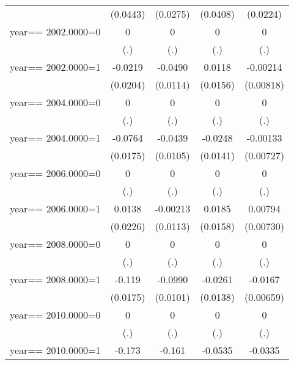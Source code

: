 \begin{table}[htbp]
\begin{tabular}{l*{4}{c}}
                & (0.0443)         & (0.0275)         & (0.0408)         & (0.0224)         \\
year==  2002.0000=0&        0         &        0         &        0         &        0         \\
                &      (.)         &      (.)         &      (.)         &      (.)         \\
year==  2002.0000=1&  -0.0219         &  -0.0490\sym{***}&   0.0118         & -0.00214         \\
                & (0.0204)         & (0.0114)         & (0.0156)         &(0.00818)         \\
year==  2004.0000=0&        0         &        0         &        0         &        0         \\
                &      (.)         &      (.)         &      (.)         &      (.)         \\
year==  2004.0000=1&  -0.0764\sym{***}&  -0.0439\sym{***}&  -0.0248\sym{*}  & -0.00133         \\
                & (0.0175)         & (0.0105)         & (0.0141)         &(0.00727)         \\
year==  2006.0000=0&        0         &        0         &        0         &        0         \\
                &      (.)         &      (.)         &      (.)         &      (.)         \\
year==  2006.0000=1&   0.0138         & -0.00213         &   0.0185         &  0.00794         \\
                & (0.0226)         & (0.0113)         & (0.0158)         &(0.00730)         \\
year==  2008.0000=0&        0         &        0         &        0         &        0         \\
                &      (.)         &      (.)         &      (.)         &      (.)         \\
year==  2008.0000=1&   -0.119\sym{***}&  -0.0990\sym{***}&  -0.0261\sym{*}  &  -0.0167\sym{**} \\
                & (0.0175)         & (0.0101)         & (0.0138)         &(0.00659)         \\
year==  2010.0000=0&        0         &        0         &        0         &        0         \\
                &      (.)         &      (.)         &      (.)         &      (.)         \\
year==  2010.0000=1&   -0.173\sym{***}&   -0.161\sym{***}&  -0.0535\sym{***}&  -0.0335\sym{***}\\

\end{tabular}
\end{table}
